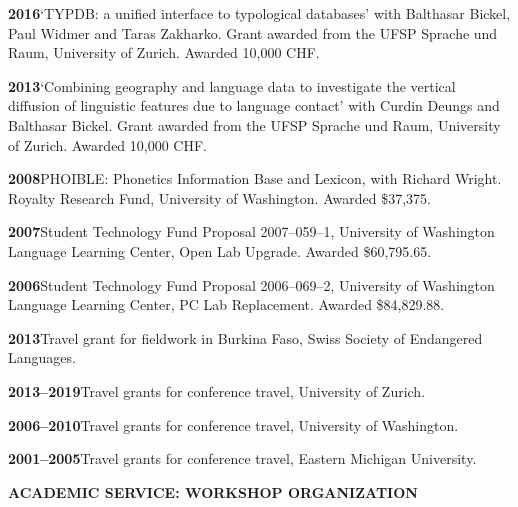 \documentclass[11pt]{article}
\newcommand{\hangpara}{
 \setlength{\parindent}{0in} %
 \hangindent=0.42in %
}
\begin{document}
\vskip 6pt
\hangpara
{\bf 2016}\hspace{1ex}`TYPDB: a unified interface to typological databases' with Balthasar Bickel, Paul Widmer and Taras Zakharko. Grant awarded from the UFSP Sprache und Raum, University of Zurich. Awarded 10,000 CHF.

\vskip 6pt
\hangpara
{\bf 2013}\hspace{1ex}`Combining geography and language data to investigate the vertical diffusion of linguistic features due to language contact' with Curdin Deungs and Balthasar Bickel. Grant awarded from the UFSP Sprache und Raum, University of Zurich. Awarded 10,000 CHF.

\vskip 6pt
\hangpara
{\bf 2008}\hspace{1ex}PHOIBLE: Phonetics Information Base and Lexicon, with Richard Wright. Royalty Research Fund, University of Washington. Awarded \$37,375.

\vskip 6pt
\hangpara
{\bf 2007}\hspace{1ex}Student Technology Fund Proposal 2007--059--1, University of Washington Language Learning Center, Open Lab Upgrade. Awarded \$60,795.65.

\vskip 6pt
\hangpara
{\bf 2006}\hspace{1ex}Student Technology Fund Proposal 2006--069--2, University of Washington Language Learning Center, PC Lab Replacement. Awarded \$84,829.88.

\vskip 6pt
\hangpara
{\bf 2013}\hspace{1ex}Travel grant for fieldwork in Burkina Faso, Swiss Society of Endangered Languages.

\vskip 6pt
\hangpara
{\bf 2013--2019}\hspace{1ex}Travel grants for conference travel, University of Zurich.

\vskip 6pt
\hangpara
{\bf 2006--2010}\hspace{1ex}Travel grants for conference travel, University of Washington.

\vskip 6pt
\hangpara
{\bf 2001--2005}\hspace{1ex}Travel grants for conference travel, Eastern Michigan University.


\vskip 20pt
\begin{flushleft}
{\bf ACADEMIC SERVICE: WORKSHOP ORGANIZATION}
\end{flushleft}

\end{document}
